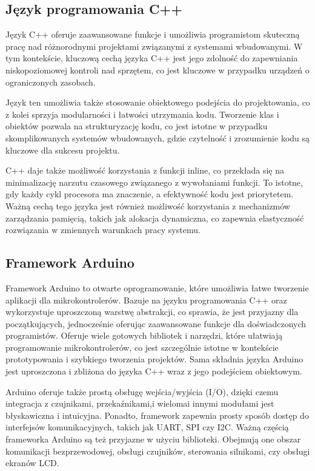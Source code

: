 \documentclass[12pt,twoside]{article}
\begin{document}
\subsection{Język programowania C++}
{
Język C++ oferuje zaawansowane funkcje i umożliwia programistom skuteczną pracę nad różnorodnymi projektami związanymi z systemami wbudowanymi.
W tym kontekście, kluczową cechą języka C++ jest jego zdolność do zapewniania niskopoziomowej kontroli nad sprzętem,
co jest kluczowe w przypadku urządzeń o ograniczonych zasobach. 

Język ten umożliwia także stosowanie obiektowego podejścia do projektowania, co z kolei sprzyja modularności i łatwości utrzymania kodu.
Tworzenie klas i obiektów pozwala na strukturyzację kodu, co jest istotne w przypadku skomplikowanych systemów wbudowanych, gdzie 
czytelność i zrozumienie kodu są kluczowe dla sukcesu projektu.

C++ daje także możliwość korzystania z funkcji inline, co przekłada się na minimalizację narzutu czasowego związanego z wywołaniami funkcji.
To istotne, gdy każdy cykl procesora ma znaczenie, a efektywność kodu jest priorytetem. Ważną cechą tego języka  
 jest również możliwość korzystania z mechanizmów zarządzania pamięcią, takich jak alokacja dynamiczna, co zapewnia elastyczność rozwiązania
 w zmiennych warunkach pracy systemu.
}
\subsection{Framework Arduino}
{Framework Arduino to otwarte oprogramowanie, które umożliwia łatwe tworzenie aplikacji dla mikrokontrolerów. 
Bazuje na języku programowania C++ oraz wykorzystuje uproszczoną warstwę abstrakcji, co sprawia, że 
jest przyjazny dla początkujących, jednocześnie oferując zaawansowane funkcje dla doświadczonych programistów.
Oferuje wiele gotowych bibliotek i narzędzi, które ułatwiają programowanie mikrokontrolerów, 
co jest szczególnie istotne w kontekście prototypowania i szybkiego tworzenia projektów.
Sama składnia języka Arduino jest uproszczona i zbliżona do języka C++ wraz z jego podejściem obiektowym.

Arduino oferuje także prostą obsługę wejścia/wyjścia (I/O), dzięki czemu integracja z czujnikami, przekaźnikami,i wielomai 
innymi modułami jest błyskawiczna i intuicyjna. Ponadto, framework zapewnia prosty sposób dostęp do interfejsów komunikacyjnych,
 takich jak UART, SPI czy I2C. Ważną częścią frameworka Arduino są też przyjazne w użyciu biblioteki. Obejmują one obszar komunikacji 
 bezprzewodowej, obsługi czujników, sterowania silnikami, czy obsługi ekranów LCD.}
\end{document}
